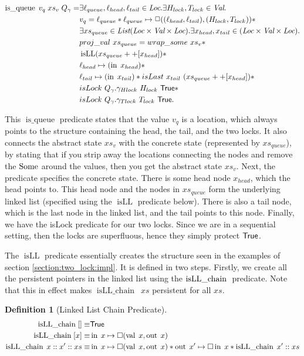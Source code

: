 \documentclass[twoside,11pt,openright]{report}
\newtheorem{definition}{Definition}[section]
\newcommand{\isqueue}{\operatorname{is\_queue}}
\newcommand{\isLLchain}[1]{\operatorname{isLL\_chain} \; #1}
\newcommand{\isLL}{\operatorname{isLL}}
\newcommand{\nIn}[1]{\operatorname{in} \; #1}
\newcommand{\nVal}[1]{\operatorname{val} \; #1}
\newcommand{\nOut}[1]{\operatorname{out} \; #1}
\begin{document}
\begin{align*}
  \isqueue \; v_q \; xs_v \; Q_\gname = &\exists \loc_{queue}, \loc_{head}, \loc_{tail} \in \Loc . \exists H_{lock}, T_{lock} \in \Val . \\
  &v_q = \loc_{queue} \ast \loc_{queue} \mapsto\persistently ((\loc_{head}, \loc_{tail}), (H_{lock}, T_{lock})) \ast\\
  &\exists xs_{queue} \in \List (\Loc \times \Val \times \Loc) . \exists x_{head}, x_{tail} \in (\Loc \times \Val \times \Loc) .\\
	&proj\_val \ xs_{queue} = wrap\_some \ xs_v \ast\\
	&\isLL (xs_{queue} ++ [x_{head}]) \ast\\
	&\loc_{head} \mapsto (\nIn{x_{head}}) \ast\\
	&\loc_{tail} \mapsto (\nIn{x_{tail}}) \ast isLast \ x_{tail} \ (xs_{queue} ++ [x_{head}]) \ast\\
	&isLock \ Q_\gname.\gname_{Hlock} \ H_{lock} \ \TRUE \ast\\
	&isLock \ Q_\gname.\gname_{Tlock} \ T_{lock} \ \TRUE.
\end{align*}

This $\isqueue$ predicate states that the value $v_q$ is a location, which always points to the structure containing the head, the tail, and the two locks. It also connects the abstract state $xs_v$ with the concrete state (represented by $xs_{queue}$), by stating that if you strip away the locations connecting the nodes and remove the $\operatorname{Some}$ around the values, then you get the abstract state $xs_v$. Next, the predicate specifies the concrete state. There is some head node $x_{head}$, which the head points to. This head node and the nodes in $xs_{queue}$ form the underlying linked list (specified using the $\isLL$ predicate below). There is also a tail node, which is the last node in the linked list, and the tail points to this node.
Finally, we have the isLock predicate for our two locks. Since we are in a sequential setting, then the locks are superfluous, hence they simply protect $\textsf{True}$.

The $\isLL$ predicate essentially creates the structure seen in the examples of section \ref{section:two_lock:impl}. It is defined in two steps. Firstly, we create all the persistent pointers in the linked list using the $\isLLchain$ predicate. Note that this in effect makes $\isLLchain \ xs$ persistent for all $xs$.
\begin{definition}[Linked List Chain Predicate]
  \begin{align*}
    \isLLchain{[]} \equiv& \TRUE\\
    \isLLchain{[x]} \equiv& \nIn{x} \mapsto\square (\nVal{x}, \nOut{x})\\
    \isLLchain{x :: x' :: xs} \equiv& \nIn{x} \mapsto\square (\nVal{x}, \nOut{x}) \ast \nOut{x'} \mapsto\square \nIn{x} \ast \isLLchain{x' :: xs}
  \end{align*}
\end{definition}
\end{document}

